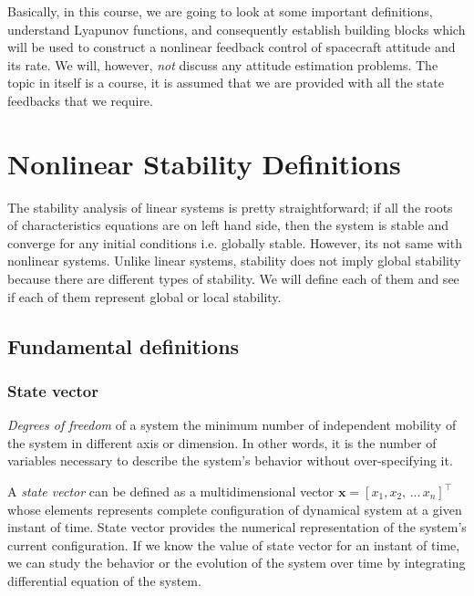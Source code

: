 \documentclass{article}
\begin{document}
Basically, in this course, we are going to look at some important definitions, understand Lyapunov functions, and consequently establish building blocks which will be used to construct a nonlinear feedback control of spacecraft attitude and its rate. We will, however, \textit{not} discuss any attitude estimation problems. The topic in itself is a course, it is assumed that we are provided with all the state feedbacks that we require.


\section{Nonlinear Stability Definitions}
The stability analysis of linear systems is pretty straightforward; if all the roots of characteristics equations are on left hand side, then the system is stable and converge for any initial conditions i.e. globally stable. However, its not same with nonlinear systems. Unlike linear systems, stability does not imply global stability because there are different types of stability. We will define each of them and see if each of them represent global or local stability.

\subsection{Fundamental definitions}
\subsubsection*{State vector}
\textit{Degrees of freedom} of a system the minimum number of independent mobility of the system in different axis or dimension. In other words, it is the number of variables necessary to describe the system's behavior without over-specifying it.

A \textit{state vector} can be defined as a multidimensional vector $\bm{x} = [x_{1}, x_{2},\,...\,x_{n}]^\intercal$ whose elements represents complete configuration of dynamical system at a given instant of time. State vector provides the numerical representation of the system's current configuration. If we know the value of state vector for an instant of time, we can study the behavior or the evolution of the system over time by integrating differential equation of the system.  
\end{document}
